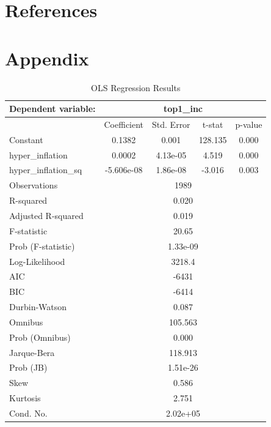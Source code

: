 \documentclass[a4paper, 12pt]{article}
\begin{document}
\newpage

\section*{References}

\printbibliography[heading=none]
\newpage

\section*{Appendix}

\begin{table}[H]
    \centering
    \caption{OLS Regression Results}
    \label{tab:regression}
    \begin{tabular}{lcccc}
    \toprule
    \textbf{Dependent variable:} & \multicolumn{4}{c}{top1\_inc} \\
    \midrule
     & Coefficient & Std. Error & t-stat & p-value \\
    \midrule
    Constant                & 0.1382     & 0.001      & 128.135  & 0.000 \\
    hyper\_inflation        & 0.0002     & 4.13e-05   & 4.519    & 0.000 \\
    hyper\_inflation\_sq    & -5.606e-08 & 1.86e-08   & -3.016   & 0.003 \\
    \midrule
    Observations            & \multicolumn{4}{c}{1989} \\
    R-squared               & \multicolumn{4}{c}{0.020} \\
    Adjusted R-squared      & \multicolumn{4}{c}{0.019} \\
    F-statistic             & \multicolumn{4}{c}{20.65} \\
    Prob (F-statistic)      & \multicolumn{4}{c}{1.33e-09} \\
    Log-Likelihood          & \multicolumn{4}{c}{3218.4} \\
    AIC                     & \multicolumn{4}{c}{-6431} \\
    BIC                     & \multicolumn{4}{c}{-6414} \\
    \midrule
    Durbin-Watson           & \multicolumn{4}{c}{0.087} \\
    Omnibus                 & \multicolumn{4}{c}{105.563} \\
    Prob (Omnibus)          & \multicolumn{4}{c}{0.000} \\
    Jarque-Bera             & \multicolumn{4}{c}{118.913} \\
    Prob (JB)               & \multicolumn{4}{c}{1.51e-26} \\
    Skew                    & \multicolumn{4}{c}{0.586} \\
    Kurtosis                & \multicolumn{4}{c}{2.751} \\
    Cond. No.               & \multicolumn{4}{c}{2.02e+05} \\
    \bottomrule
    \end{tabular}
\end{table}
\end{document}
